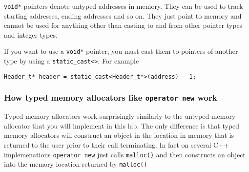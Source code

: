 \documentclass{article}
\begin{document}
\texttt{void*} pointers denote untyped addresses in memory.  They can be used
to track starting addresses, ending addresses and so on.  They just point to
memory and cannot be used for anything other than casting to and from other
pointer types and integer types.

If you want to use a \texttt{void*} pointer, you must cast them to pointers of
another type by using a \texttt{static\_cast<>}.  For example
\begin{lstlisting}
Header_t* header = static_cast<Header_t*>(address) - 1;
\end{lstlisting}

\subsubsection{How typed memory allocators like \texttt{operator new} work}
Typed memory allocators work surprisingly similarly to the untyped memory
allocator that you will implement in this lab.  The only difference is that
typed memory allocators will construct an object in the location in memory
that is returned to the user prior to their call terminating.  In fact on
several C++ implemenations \texttt{operator new} just calls \texttt{malloc()}
and then constructs an object into the memory location returned by
\texttt{malloc()}
\end{document}
